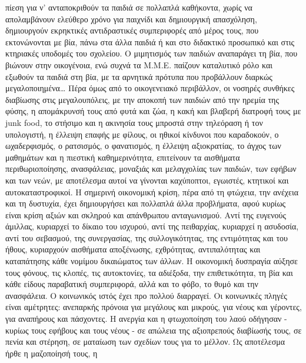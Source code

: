 \documentclass[12pt,a4paper]{book}
\begin{document}
πίεση για ν' ανταποκριθούν τα παιδιά σε πολλαπλά καθήκοντα, χωρίς να
απολαμβάνουν ελεύθερο χρόνο για παιχνίδι και δημιουργική απασχόληση, δημιουργούν
εκρηκτικές αντιδραστικές συμπεριφορές από μέρος τους, που εκτονώνονται με βία,
πάνω στα άλλα παιδιά ή και στο διδακτικό προσωπικό και στις κτηριακές υποδομές
του σχολείου.
\newline\setlength{\parindent}{20pt}\indent Ο μιμητισμός των παιδιών αναπαράγει
τη βία, που βιώνουν στην οικογένοια, ενώ συχνά τα Μ.Μ.Ε. παίζουν καταλυτικό ρόλο
και εξωθούν τα παιδιά στη βία, με τα αρνητικά πρότυπα που προβάλλουν διαρκώς
μεγαλοποιημένα\ldots
\newline\setlength{\parindent}{20pt}\indent Πέρα όμως από το οικογενειακό
περιβάλλον, οι νοσηρές συνθήκες διαβίωσης στις μεγαλουπόλεις, με την αποκοπή των
παιδιών από την ηρεμία της φύσης, η απομάκρυνσή τους από φυτά και ζώα, η κακή
και βλαβερή διατροφή τους με junk food, το στήσιμο και η ακινησία τους μπροστά
στην τηλεόραση ή τον υπολογιστή, η έλλειψη επαφής με φίλους, οι ηθικοί κίνδυνοι
που καραδοκούν, ο ωχαδερφισμός, ο ρατσισμός, ο φανατισμός, η έλλειψη
αξιοκρατίας, το άγχος των μαθημάτων και η πιεστική καθημερινότητα, επιτείνουν τα
αισθήματα περιθωριοποίησης, ανασφάλειας, μοναξιάς και μελαγχολίας των παιδιών,
των εφήβων και των νεών, με αποτέλεσμα αυτοί να γίνονται καχύποπτοι, εγωιστές,
κτητικοί και αυτοκαταστροφικοί.
\newline\setlength{\parindent}{20pt}\indent Η σημερινή οικονομική κρίση, πέρα
από τη φτώχεια, την ανέχεια και τη δυστυχία, έχει δημιουργήσει και πολλαπλά άλλα
προβλήματα, αφού κυρίως είναι κρίση αξιών και σκληρού και απάνθρωπου
ανταγωνισμού. Αντί της ευγενούς άμιλλας, κυριαρχεί το δίκαιο του ισχυρού, αντί
της πειθαρχίας, κυριαρχεί η ασυδοσία, αντί του σεβασμού, της συνεργασίας, της
συλλογικότητας, της εντιμότητας και του ήθους, κυριαρχούν αισθήματα αποξένωσης,
εχθρότητας, αντιπαλότητας και καταπάτησης κάθε νομίμου δικαιώματος των άλλων. Η
οικονομική δυσπραγία αύξησε τους φόνους, τις κλοπές, τις αυτοκτονίες, τα
αδιέξοδα, την επιθετικότητα, τη βία και κάθε είδους παραβατική συμπεριφορά, αλλά
και το φόβο, το θυμό και την ανασφάλεια.
\newline\setlength{\parindent}{20pt}\indent Ο κοινωνικός ιστός έχει προ πολλού
διαρραγεί. Οι κοινωνικές πληγές είναι αμέτρητες: ανεπαρκής πρόνοια  για μεγάλους και μικρούς, για νέους και γέροντες, για αναπήρους και πάσχοντες. Η
ανεργία και η φτωχοποίηση του λαού οδήγησαν - κυρίως τους εφήβους και τους
νέους - σε απώλεια της αξιοπρεπούς διαβίωσής τους, σε πενία και στέρηση, σε
ματαίωση των σχεδίων τους για το μέλλον. Ως αποτέλεσμα ήρθε η μαζοποίησή τους, η
\end{document}
